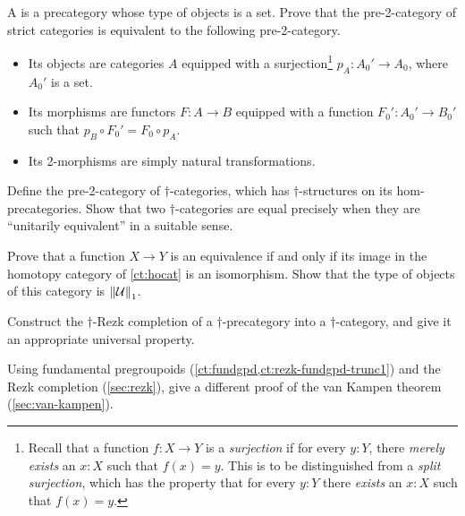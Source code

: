 \begin{ex}
  A  is a precategory whose type of objects is a set.
  Prove that the pre-2-category of strict categories is equivalent to the following pre-2-category.
  \begin{itemize}
  \item Its objects are categories $A$ equipped with a surjection\footnote{Recall that a function $f:X\to Y$ is a \emph{surjection} if for every $y:Y$, there \emph{merely exists} an $x:X$ such that $f(x)=y$.  This is to be distinguished from a \emph{split surjection}, which has the property that for every $y:Y$ there \emph{exists} an $x:X$ such that $f(x)=y$.} $p_A:A_0'\to A_0$, where $A_0'$ is a set.
  \item Its morphisms are functors $F:A\to B$ equipped with a function $F_0':A_0' \to B_0'$ such that $p_B \circ F_0' = F_0 \circ p_A$.
  \item Its 2-morphisms are simply natural transformations.
  \end{itemize}
\end{ex}

\begin{ex}
  Define the pre-2-category of $\dagger$-categories, which has $\dagger$-structures on its hom-precategories.
  Show that two $\dagger$-categories are equal precisely when they are ``unitarily equivalent'' in a suitable sense.
\end{ex}

\begin{ex}\label{ct:ex:hocat}
  Prove that a function $X\to Y$ is an equivalence if and only if its image in the homotopy category of \autoref{ct:hocat} is an isomorphism.
  Show that the type of objects of this category is $\left\Vert \mathcal{U}\right\Vert_{1}$.
\end{ex}

\begin{ex}
  Construct the $\dagger$-Rezk completion of a $\dagger$-precategory into a $\dagger$-category, and give it an appropriate universal property.
\end{ex}

\begin{ex}\label{ex:rezk-vankampen}
  Using fundamental pregroupoids (\autoref{ct:fundgpd,ct:rezk-fundgpd-trunc1}) and the Rezk completion (\autoref{sec:rezk}), give a different proof of the van Kampen theorem (\autoref{sec:van-kampen}).
\end{ex}


